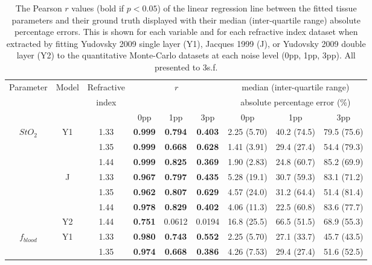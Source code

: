 \begin{subappendices}
\begin{table}[htb!]
    \centering
    \caption{The Pearson $r$ values (bold if $p<0.05$) of the linear regression line between the fitted tissue parameters and their ground truth displayed with their median (inter-quartile range) absolute percentage errors. This is shown for each variable and for each refractive index dataset when extracted by fitting Yudovsky 2009 single layer (Y1), Jacques 1999 (J), or Yudovsky 2009 double layer (Y2) to the quantitative Monte-Carlo datasets at each noise level (0pp, 1pp, 3pp). All presented to 3s.f.}
    \begin{tabular}{|ccc|ccc|ccc|}
        \hline
        Parameter & Model & Refractive & \multicolumn{3}{c}{$r$} & \multicolumn{3}{|c|}{median (inter-quartile range)} \\
        & & index & \multicolumn{3}{c}{} & \multicolumn{3}{|c|}{absolute percentage error (\%)} \\
        & & & 0pp & 1pp & 3pp & 0pp & 1pp & 3pp \\
        \hline
        \multirow{7}{*}{$StO_2$} & \multirow{3}{*}{Y1} & 1.33 & \textbf{0.999} & \textbf{0.794} & \textbf{0.403} & 2.25 (5.70) & 40.2 (74.5) & 79.5 (75.6) \\
        & & 1.35 & \textbf{0.999} & \textbf{0.668} & \textbf{0.628} & 1.41 (3.91) & 29.4 (27.4) & 54.4 (79.3) \\
        & & 1.44 & \textbf{0.999} & \textbf{0.825} & \textbf{0.369} & 1.90 (2.83) & 24.8 (60.7) & 85.2 (69.9) \\
        \cline{2-9}
        & \multirow{3}{*}{J} & 1.33 & \textbf{0.967} & \textbf{0.797} & \textbf{0.435} & 5.28 (19.1) & 30.7 (59.3) & 83.1 (71.2) \\
        & & 1.35 & \textbf{0.962} & \textbf{0.807} & \textbf{0.629} & 4.57 (24.0) & 31.2 (64.4) & 51.4 (81.4) \\
        & & 1.44 &  \textbf{0.978} & \textbf{0.829} & \textbf{0.402} & 4.06 (11.3) & 22.5 (60.8) & 83.6 (77.7) \\
        \cline{2-9}
        & Y2 & 1.44 & \textbf{0.751} & 0.0612 & 0.0194 & 16.8 (25.5) & 66.5 (51.5) & 68.9 (55.3) \\
        \hline
        \multirow{7}{*}{$f_{blood}$} & \multirow{3}{*}{Y1} & 1.33 & \textbf{0.980} & \textbf{0.743} & \textbf{0.552} & 2.25 (5.70) & 27.1 (33.7) & 45.7 (43.5) \\
        & & 1.35 & \textbf{0.974} & \textbf{0.668} & \textbf{0.386} & 4.26 (7.53) & 29.4 (27.4) & 51.6 (52.5) \\

\end{tabular}
\end{table}
\end{subappendices}
